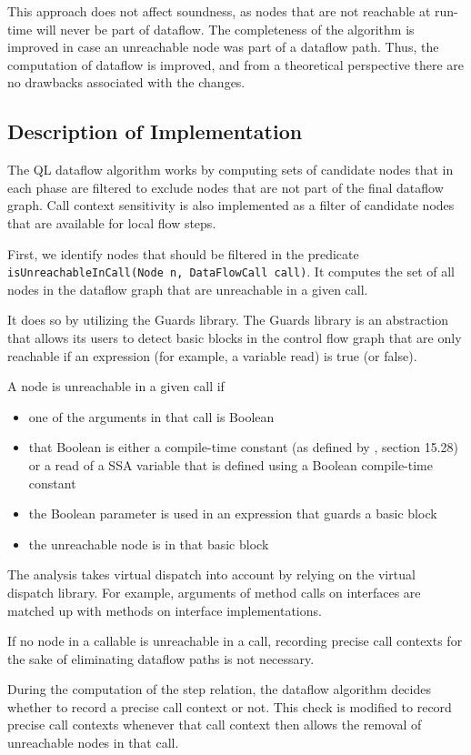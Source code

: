 This approach does not affect soundness,
as nodes that are not reachable at run-time will never be part of dataflow.
The completeness of the algorithm
is improved in case an unreachable node was part of a dataflow path.
Thus, the computation of dataflow is improved, and from a theoretical perspective 
there are no drawbacks associated with the changes.

\subsection{Description of Implementation}
The QL dataflow algorithm works by computing sets of candidate nodes that 
in each phase are filtered to exclude nodes that are not part of the final dataflow graph.
Call context sensitivity is also implemented as a filter of candidate nodes
that are available for local flow steps.

First, we identify nodes that should be filtered in the
predicate \texttt{isUnreachableInCall(Node n, DataFlowCall call)}.
It computes the set of all nodes in the dataflow graph that are unreachable
in a given call.

It does so by utilizing the Guards library.
The Guards library is an abstraction that allows its users to detect 
basic blocks in the control flow graph that are only reachable if an 
expression (for example, a variable read) is true (or false).

A node is unreachable in a given call if
\begin{itemize}
    \item one of the arguments in that call is Boolean
    \item that Boolean is either a compile-time constant (as defined by \cite{jls}, section 15.28)
    or a read of a SSA variable that is defined using a Boolean compile-time constant
    \item the Boolean parameter is used in an expression that guards a basic block
    \item the unreachable node is in that basic block
\end{itemize}
The analysis takes virtual dispatch into account by relying on the virtual
dispatch library.
For example, 
arguments of method calls on interfaces are matched up with methods 
on interface implementations.

If no node in a callable is unreachable in a call, 
recording precise call contexts for the sake of eliminating dataflow paths 
is not necessary.

During the computation of the step relation, the dataflow algorithm 
decides whether to record a precise call context or not.
This check is modified to record precise call contexts whenever that call context 
then allows the removal of unreachable nodes in that call.

